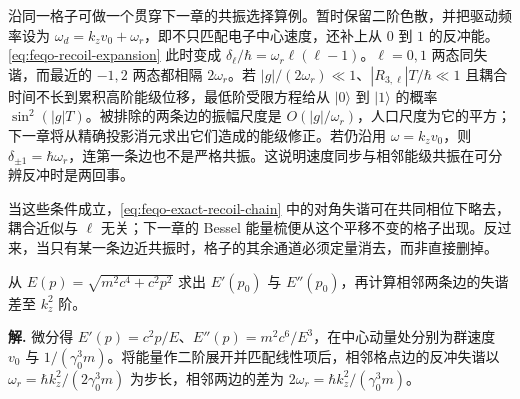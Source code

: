 沿同一格子可做一个贯穿下一章的共振选择算例。暂时保留二阶色散，并把驱动频率设为 \(\omega_d=k_zv_0+\omega_r\)，即不只匹配电子中心速度，还补上从 \(0\) 到 \(1\) 的反冲能。\cref{eq:feqo-recoil-expansion} 此时变成 \(\delta_\ell/\hbar=\omega_r\ell(\ell-1)\)。\(\ell=0,1\) 两态同失谐，而最近的 \(-1,2\) 两态都相隔 \(2\omega_r\)。若 \(|g|/(2\omega_r)\ll1\)、\(|R_{3,\ell}|T/\hbar\ll1\) 且耦合时间不长到累积高阶能级位移，最低阶受限方程给从 \(|0\rangle\) 到 \(|1\rangle\) 的概率 \(\sin^2(|g|T)\)。被排除的两条边的振幅尺度是 \(O(|g|/\omega_r)\)，人口尺度为它的平方；下一章将从精确投影消元求出它们造成的能级修正。若仍沿用 \(\omega=k_zv_0\)，则 \(\delta_{\pm1}=\hbar\omega_r\)，连第一条边也不是严格共振。这说明速度同步与相邻能级共振在可分辨反冲时是两回事。

当这些条件成立，\cref{eq:feqo-exact-recoil-chain} 中的对角失谐可在共同相位下略去，耦合近似与 \(\ell\) 无关；下一章的 Bessel 能量梳便从这个平移不变的格子出现。反过来，当只有某一条边近共振时，格子的其余通道必须定量消去，而非直接删掉。



\par
\begin{workedexample}
从 \(E(p)=\sqrt{m^2c^4+c^2p^2}\) 求出 \(E'(p_0)\) 与 \(E''(p_0)\)，再计算相邻两条边的失谐差至 \(k_z^2\) 阶。

\textbf{解.} 微分得 \(E'(p)=c^2p/E\)、\(E''(p)=m^2c^6/E^3\)，在中心动量处分别为群速度 \(v_0\) 与 \(1/(\gamma_0^3m)\)。将能量作二阶展开并匹配线性项后，相邻格点边的反冲失谐以 \(\omega_r=\hbar k_z^2/(2\gamma_0^3m)\) 为步长，相邻两边的差为 \(2\omega_r=\hbar k_z^2/(\gamma_0^3m)\)。
\end{workedexample}
\par
